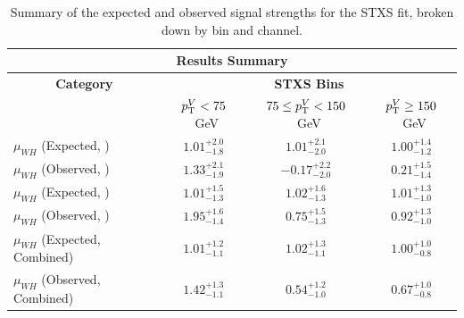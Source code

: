 \begin{table}[htp]
  \centering
  \begin{tabular}{l|c|c|c}
    \hline
    \multicolumn{4}{c}{\textbf{Results Summary}} \\
    \hline
    \multicolumn{1}{c}{\textbf{Category}} & \multicolumn{3}{c}{\textbf{STXS Bins}} \\
    & $p_{\mathrm{T}}^{V} < 75$~GeV & $75 \leq p_{\mathrm{T}}^{V} < 150$~GeV & $p_{\mathrm{T}}^{V} \geq 150$~GeV \\
    \hline
    $\mu_{WH}$ (Expected, \zdom{}) & $1.01^{+2.0}_{-1.8}$ & $1.01^{+2.1}_{-2.0}$ & $1.00^{+1.4}_{-1.2}$ \\
    $\mu_{WH}$ (Observed, \zdom{}) & $1.33^{+2.1}_{-1.9}$ & $-0.17^{+2.2}_{-2.0}$ & $0.21^{+1.5}_{-1.4}$ \\
    \hline
    $\mu_{WH}$ (Expected, \zdep{}) & $1.01^{+1.5}_{-1.3}$ & $1.02^{+1.6}_{-1.3}$ & $1.01^{+1.3}_{-1.0}$ \\
    $\mu_{WH}$ (Observed, \zdep{}) & $1.95^{+1.6}_{-1.4}$ & $0.75^{+1.5}_{-1.3}$ & $0.92^{+1.3}_{-1.0}$ \\
    \hline
    $\mu_{WH}$ (Expected, Combined) & $1.01^{+1.2}_{-1.1}$ & $1.02^{+1.3}_{-1.1}$ & $1.00^{+1.0}_{-0.8}$ \\
    $\mu_{WH}$ (Observed, Combined) & $1.42^{+1.3}_{-1.1}$ & $0.54^{+1.2}_{-1.0}$ & $0.67^{+1.0}_{-0.8}$ \\
    \hline
  \end{tabular}
  \caption{Summary of the expected and observed signal strengths for the \wh{} STXS fit, broken down by \ptv{} bin and channel.}\label{tab:wh_stxs_results_summary}
\end{table}